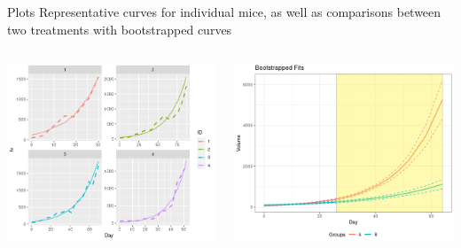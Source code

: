 \documentclass{beamer}
\begin{document}
\begin{frame}{Plots}
Representative curves for individual mice, as well as comparisons between two treatments with bootstrapped curves
\begin{columns}
\begin{column}{0.45\textwidth}
\begin{center}
\includegraphics[scale=0.45]{img/tumr_fit.png}
\end{center}
\end{column}
\begin{column}{0.5\textwidth}  %
\begin{center}
\includegraphics[scale=0.3]{img/tumr_boot.png}
\end{center}
\end{column}
\end{columns}
\end{frame}
\end{document}
